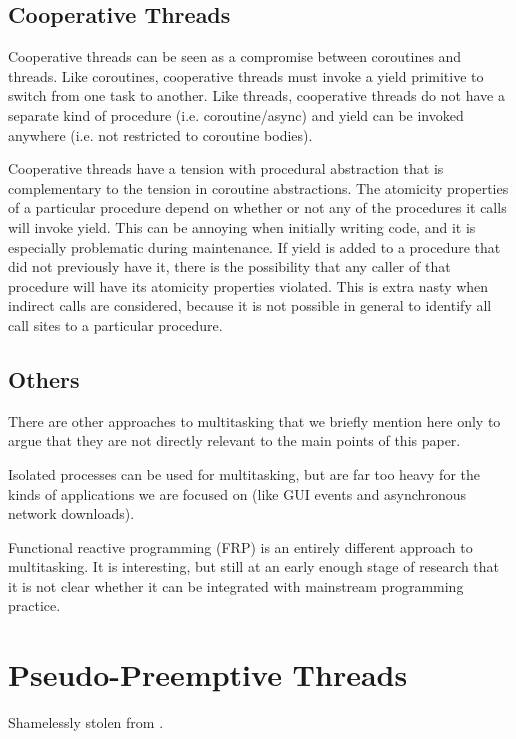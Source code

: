 \documentclass[10pt,preprint]{sigplanconf}
\begin{document}
\subsection{Cooperative Threads}

Cooperative threads can be seen as a compromise between coroutines and threads.
Like coroutines, cooperative threads must invoke a yield primitive to switch from one task to another.
Like threads, cooperative threads do not have a separate kind of procedure (i.e. coroutine/async) and yield can be invoked anywhere (i.e. not restricted to coroutine bodies).

Cooperative threads have a tension with procedural abstraction that is complementary to the tension in coroutine abstractions.
The atomicity properties of a particular procedure depend on whether or not any of the procedures it calls will invoke yield.
This can be annoying when initially writing code, and it is especially problematic during maintenance.
If yield is added to a procedure that did not previously have it, there is the possibility that any caller of that procedure will have its atomicity properties violated.
This is extra nasty when indirect calls are considered, because it is not possible in general to identify all call sites to a particular procedure.

\subsection{Others}

There are other approaches to multitasking that we briefly mention here only to argue that they are not directly relevant to the main points of this paper.

Isolated processes can be used for multitasking, but are far too heavy for the kinds of applications we are focused on (like GUI events and asynchronous network downloads).

Functional reactive programming (FRP) is an entirely different approach to multitasking.
It is interesting, but still at an early enough stage of research that it is not clear whether it can be integrated with mainstream programming practice.

\section{Pseudo-Preemptive Threads}

Shamelessly stolen from \cite{Krohn2007}.
\end{document}
